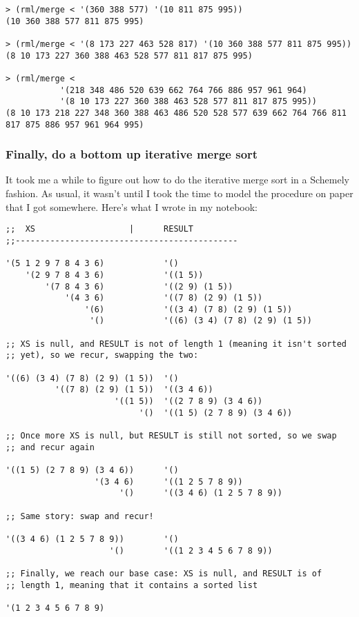 \documentclass[12pt,openright,draft]{book}
\begin{document}
\begin{verbatim}
> (rml/merge < '(360 388 577) '(10 811 875 995))
(10 360 388 577 811 875 995)

> (rml/merge < '(8 173 227 463 528 817) '(10 360 388 577 811 875 995))
(8 10 173 227 360 388 463 528 577 811 817 875 995)

> (rml/merge <
           '(218 348 486 520 639 662 764 766 886 957 961 964)
           '(8 10 173 227 360 388 463 528 577 811 817 875 995))
(8 10 173 218 227 348 360 388 463 486 520 528 577 639 662 764 766 811 817 875 886 957 961 964 995)
\end{verbatim}

\subsubsection{Finally, do a bottom up iterative merge sort}

It took me a while to figure out how to do the iterative merge sort in
a Schemely fashion. As usual, it wasn't until I took the time to model
the procedure on paper that I got somewhere. Here's what I wrote in my
notebook:

\begin{verbatim}
;;  XS                   |      RESULT
;;---------------------------------------------

'(5 1 2 9 7 8 4 3 6)            '()
    '(2 9 7 8 4 3 6)            '((1 5))
        '(7 8 4 3 6)            '((2 9) (1 5))
            '(4 3 6)            '((7 8) (2 9) (1 5))
                '(6)            '((3 4) (7 8) (2 9) (1 5))
                 '()            '((6) (3 4) (7 8) (2 9) (1 5))

;; XS is null, and RESULT is not of length 1 (meaning it isn't sorted
;; yet), so we recur, swapping the two:

'((6) (3 4) (7 8) (2 9) (1 5))  '()
          '((7 8) (2 9) (1 5))  '((3 4 6))
                      '((1 5))  '((2 7 8 9) (3 4 6))
                           '()  '((1 5) (2 7 8 9) (3 4 6))

;; Once more XS is null, but RESULT is still not sorted, so we swap
;; and recur again

'((1 5) (2 7 8 9) (3 4 6))      '()
                  '(3 4 6)      '((1 2 5 7 8 9))
                       '()      '((3 4 6) (1 2 5 7 8 9))

;; Same story: swap and recur!

'((3 4 6) (1 2 5 7 8 9))        '()
                     '()        '((1 2 3 4 5 6 7 8 9))

;; Finally, we reach our base case: XS is null, and RESULT is of
;; length 1, meaning that it contains a sorted list

'(1 2 3 4 5 6 7 8 9)
\end{verbatim}
\end{document}
